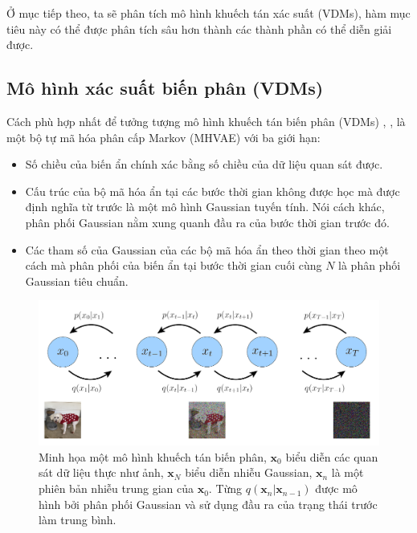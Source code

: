 \documentclass[14pt, a4paper]{article}
\numberwithin{equation}{section}
\numberwithin{figure}{section}
\numberwithin{dl}{section}
\numberwithin{md}{section}
\numberwithin{bd}{section}
\numberwithin{dn}{section}
\numberwithin{hq}{section}
\begin{document}
    Ở mục tiếp theo, ta sẽ phân tích mô hình khuếch tán xác suất (VDMs), hàm mục tiêu này có thể được phân tích sâu hơn thành các thành phần có thể diễn giải được.

    \subsection{Mô hình xác suất biến phân (VDMs)}

    Cách phù hợp nhất để tưởng tượng mô hình khuếch tán biến phân (VDMs) \cite{sohl2015deep}, \cite{ho2020denoising}, \cite{kingma2021variational} là một bộ tự mã hóa phân cấp Markov (MHVAE) với ba giới hạn:

    \begin{itemize}
        \item Số chiều của biến ẩn chính xác bằng số chiều của dữ liệu quan sát được.
        \item Cấu trúc của bộ mã hóa ẩn tại các bước thời gian không được học mà được định nghĩa từ trước là một mô hình Gaussian tuyến tính.
        Nói cách khác, phân phối Gaussian nằm xung quanh đầu ra của bước thời gian trước đó.
        \item Các tham số của Gaussian của các bộ mã hóa ẩn theo thời gian theo một cách mà phân phối của biến ẩn tại bước thời gian cuối cùng $N$ là phân phối Gaussian tiêu chuẩn. 
    \end{itemize}

    \begin{figure}[h!]
        \centering
        \includegraphics[width=\textwidth]{VDM-Graph.png}
        \caption{Minh họa một mô hình khuếch tán biến phân, $\boldsymbol{x}_0$ biểu diễn các quan sát dữ liệu thực như ảnh, $\boldsymbol{x}_N$ biểu diễn nhiễu Gaussian, $\boldsymbol{x}_n$ là một phiên bản nhiễu trung gian của $\boldsymbol{x}_0$.
        Từng $q(\boldsymbol{x}_n \vert \boldsymbol{x}_{n-1})$ được mô hình bởi phân phối Gaussian và sử dụng đầu ra của trạng thái trước làm trung bình.}
        \label{fig:VDM-Graph}
    \end{figure}
\end{document}
